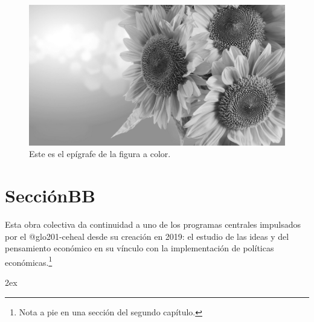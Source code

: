 		\else
			\ifEPUB
			\begin{figure}[!ht]
			\centering
			\includegraphics[width=\textwidth]{./media/bn-imagen1.png}
			\caption{Este es el epígrafe de la figura a color.}
			\end{figure}
			\fi
		\fi
	\fi
\fi

\section{SecciónBB}

Esta obra colectiva da continuidad a uno de los programas centrales impulsados por el \gls{@glo201-ceheal} desde su creación en 2019: el estudio de las ideas y del pensamiento económico en su vínculo con la implementación de políticas económicas.\footnote{Nota a pie en una sección del segundo capítulo.}

\backmatter

\ifEPUB
\begingroup
\parindent 0pt
\parskip 2ex
\def\enotesize{\normalsize}
\theendnotes
\endgroup
\fi

\ifPDF
\printnoidxglossary[type=\acronymtype,title={Índice de siglas}]
\printnoidxglossary[title={Glosario de términos}]
\printbibliography[heading=none,heading=bibintoc]
\else
	\ifBNPDF
	\printnoidxglossary[type=\acronymtype,title={Índice de siglas}]
	\printnoidxglossary[title={Glosario de términos}]
	\printbibliography[heading=none,heading=bibintoc]
	\else
		\ifODT
		\printnoidxglossary[type=\acronymtype,title={Índice de siglas}]
		\printnoidxglossary[title={Glosario de términos}]
		\printbibliography[heading=none,heading=bibintoc]
		\else
			\ifEPUB
			\printnoidxglossary[type=\acronymtype,title={Índice de siglas}]
			\printnoidxglossary[title={Glosario de términos}]
